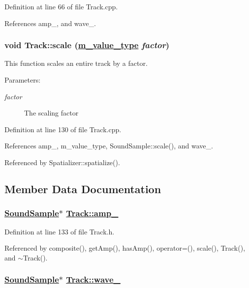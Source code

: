 Definition at line 66 of file Track.cpp.

References amp\_\-, and wave\_\-.\hypertarget{classTrack_a9}{
\subsubsection[scale]{\setlength{\rightskip}{0pt plus 5cm}void Track::scale (\hyperlink{Types_8h_a3}{m\_\-value\_\-type} {\em factor})}}
\label{classTrack_a9}


This function scales an entire track by a factor. \begin{Desc}
\item[Parameters:]
\begin{description}
\item[{\em factor}]The scaling factor \end{description}
\end{Desc}


Definition at line 130 of file Track.cpp.

References amp\_\-, m\_\-value\_\-type, Sound\-Sample::scale(), and wave\_\-.

Referenced by Spatializer::spatialize().

\subsection{Member Data Documentation}
\hypertarget{classTrack_r1}{
\subsubsection[amp\_\-]{\setlength{\rightskip}{0pt plus 5cm}\hyperlink{classSoundSample}{Sound\-Sample}$\ast$ \hyperlink{classTrack_r1}{Track::amp\_\-}}}
\label{classTrack_r1}




Definition at line 133 of file Track.h.

Referenced by composite(), get\-Amp(), has\-Amp(), operator=(), scale(), Track(), and $\sim$Track().\hypertarget{classTrack_r0}{
\subsubsection[wave\_\-]{\setlength{\rightskip}{0pt plus 5cm}\hyperlink{classSoundSample}{Sound\-Sample}$\ast$ \hyperlink{classTrack_r0}{Track::wave\_\-}}}
\label{classTrack_r0}




